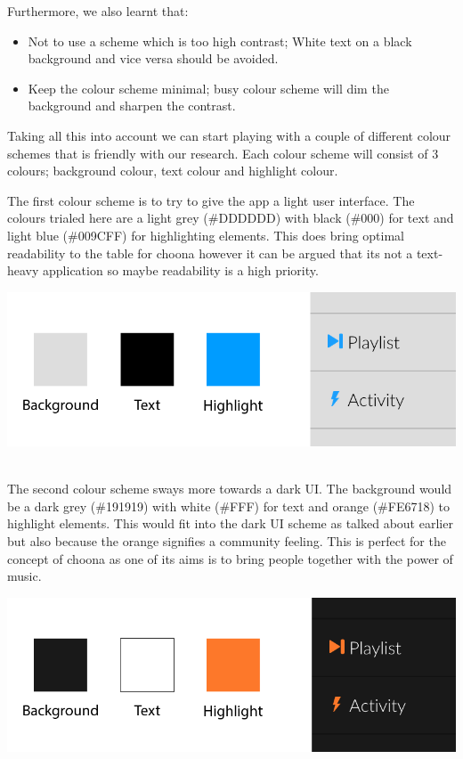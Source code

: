 \noindent Furthermore, we also learnt that:
\begin{itemize}
\item Not to use a scheme which is too high contrast; White text on a black background and vice versa should be avoided.
\item Keep the colour scheme minimal; busy colour scheme will dim the background and sharpen the contrast.
\end{itemize}

Taking all this into account we can start playing with a couple of different colour schemes that is friendly with our research. Each colour scheme will consist of 3 colours; background colour, text colour and highlight colour. 

The first colour scheme is to try to give the app a light user interface. The colours trialed here are a light grey (\#DDDDDD) with black (\#000) for text and light blue (\#009CFF) for highlighting elements. This does bring optimal readability to the table for choona however it can be argued that its not a text-heavy application so maybe readability is a high priority.\\

\begin{minipage}{\linewidth}
    \centering
        \includegraphics[scale=0.8]{./img/greybluecolours.png}
        \label{fig:bluegrey}
\end{minipage}\\

The second colour scheme sways more towards a dark UI. The background would be a dark grey (\#191919)  with white (\#FFF) for text and orange (\#FE6718) to highlight elements. This would fit into the dark UI scheme as talked about earlier but also because the orange signifies a community feeling. This is perfect for the concept of choona as one of its aims is to bring people together with the power of music. \\

\begin{minipage}{\linewidth}
\centering
\includegraphics[scale=0.8]{./img/greyorangecolours.png}
\label{fig:orangegrey}
\end{minipage}\\

